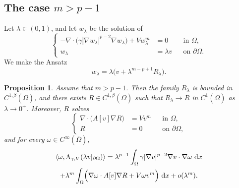 \documentclass[a4paper,12pt]{article}
\newcommand{\la}{\langle}
\newcommand{\ra}{\rangle}
\newcommand{\pr}{\partial}
\newcommand{\dd}{\,\mathrm{d}}
\newtheorem{prop}[thm]{Proposition}
\theoremstyle{definition}
\theoremstyle{remark}
\begin{document}
\subsection{The case $m>p-1$}

Let $\lambda\in(0,1)$, and let $w_\lambda$ be the solution of
\begin{equation}\label{eq:w-lambda-small}
\left\{
\begin{aligned}
-\nabla\cdot\bigl(\gamma|\nabla w_\lambda|^{p-2}\nabla w_\lambda\bigr)+Vw_\lambda^m&=0 &&\text{in }\Omega,\\
 w_\lambda&=\lambda v &&\text{on }\pr\Omega.
\end{aligned}
\right.
\end{equation}
We make the Ansatz
\begin{equation}\label{eq:ansatz-small}
w_\lambda=\lambda\bigl(v+\lambda^{m-p+1}R_\lambda\bigr).
\end{equation}

\begin{prop}\label{prop:small-data}
Assume that $m>p-1$. Then the family $R_\lambda$ is bounded in $C^{1,\beta}(\overline\Omega)$, and there exists $R\in C^{1,\beta}(\overline\Omega)$ such that $R_\lambda\to R$ in $C^1(\overline\Omega)$ as $\lambda\to0^+$. Moreover, $R$ solves
\begin{equation}\label{eq:R-equation}
\left\{
\begin{aligned}
\nabla\cdot\bigl(A[v]\nabla R\bigr)&=Vv^m &&\text{in }\Omega,\\
R&=0 &&\text{on }\pr\Omega,
\end{aligned}
\right.
\end{equation}
and for every $\omega\in C^\infty(\overline\Omega)$,
\begin{multline}\label{eq:expansion-small}
\la\omega,\Lambda_{\gamma,V}(\lambda v|_{\pr\Omega})\ra
=\lambda^{p-1}\int_\Omega \gamma|\nabla v|^{p-2}\nabla v\cdot\nabla\omega\,\dd x\\
+\lambda^m\int_\Omega\Bigl(\nabla\omega\cdot A[v]\nabla R+V\omega v^m\Bigr)\,\dd x+o(\lambda^m).
\end{multline}
\end{prop}
\end{document}
